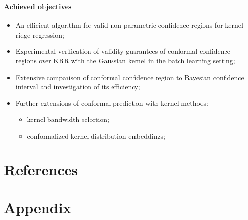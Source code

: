 \documentclass[t]{beamer}  %
\begin{document}
\begin{frame}[t]\frametitle{\insertsection}
  \framesubtitle{Achieved objectives}
  \begin{itemize}
    \item An efficient algorithm for valid non-parametric confidence regions for
    kernel ridge regression;

    \vspace{\baselineskip}
    \item Experimental verification of validity guarantees of conformal confidence
    regions over KRR with the Gaussian kernel in the batch learning setting;

    \item Extensive comparison of conformal confidence region to Bayesian confidence
    interval and investigation of its efficiency;

    \vspace{\baselineskip}
    \item Further extensions of conformal prediction with kernel methods:
    \begin{itemize}
      \item kernel bandwidth selection;
      \item conformalized kernel distribution embeddings;
    \end{itemize}
  \end{itemize}
\end{frame}


\section{References} %
\label{sec:references}

\begin{frame}[t, shrink=25]\frametitle{\insertsection}
  \printbibliography
\end{frame}


\section{Appendix} %
\label{sec:appendix}
\end{document}
